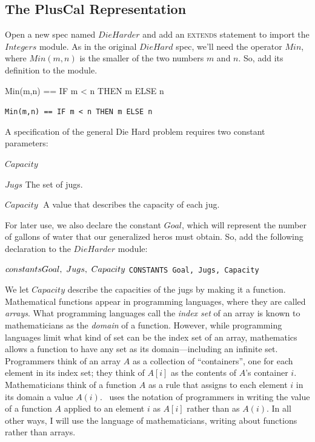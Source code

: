\documentclass[fleqn,leqno]{article}
\begin{document}
\subsection{The PlusCal Representation} 
Open a new spec named $DieHarder$ and add an \textsc{extends}
statement to import the $Integers$ module.  As in the original
$DieHard$ spec, we'll need the operator $Min$, where $Min(m,n)$ is the
smaller of the two numbers $m$ and $n$.  So, add its definition to the module.
\begin{twocols}
\begin{notla}
Min(m,n) == IF m < n THEN m ELSE n
\end{notla}
\begin{tlatex}
%
\end{tlatex}
\midcol
\verb|Min(m,n) == IF m < n THEN m ELSE n|
\end{twocols}
A specification of the general Die Hard problem requires two constant
parameters:
\begin{describe}{$Capacity\;$}
\item[$Jugs$] The set of jugs.

\item[$Capacity\;$] A value that describes the capacity of each jug.
\end{describe}
For later use, we also declare the constant $Goal$, which will
represent the number of gallons of water that our generalized heros
must obtain.  So, add the following declaration to the $DieHarder$
module:%
\begin{twocols}
$\CONSTANTS Goal, \ Jugs, \ Capacity$
\midcol
\verb|CONSTANTS Goal, Jugs, Capacity|
\end{twocols}
%
We let $Capacity$ describe the capacities of the jugs by making it a
function.  
%
Mathematical functions appear in programming languages,
where they are called 
\emph{arrays}.  What programming languages call
the \emph{index set} of an array is known to mathematicians as the
\emph{domain} of a function.  However, while programming languages
limit what kind of set can be the index set of an array, mathematics
allows a function to have any set as its domain---including an
infinite set.  Programmers think of an array $A$ as a collection of
``containers'', one for each element in its index set; they think of
$A[i]$ as the contents of $A$'s container $i$.  Mathematicians think
of a function $A$ as a rule that assigns to each element $i$ in its
domain a value $A(i)$.  \tlaplus\ uses the notation of programmers in
writing the value of a function $A$ applied to an element $i$ as
$A[i]$ rather than as $A(i)$.  In all other ways, I will use the
language of mathematicians, writing about functions rather than
arrays.
\end{document}
